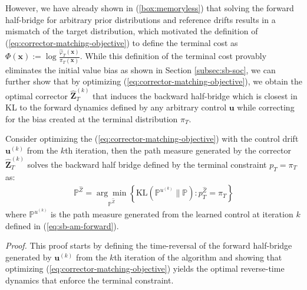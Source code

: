 \documentclass{article}
\begin{document}
However, we have already shown in (\ref{box:memoryless}) that solving the forward half-bridge for arbitrary prior distributions and reference drifts results in a mismatch of the target distribution, which motivated the definition of (\ref{eq:corrector-matching-objective}) to define the terminal cost as $\Phi(\boldsymbol{x}):= \log \frac{\hat\varphi_T(\boldsymbol{x})}{\pi_T(\boldsymbol{x})}$. While this definition of the terminal cost provably eliminates the initial value bias as shown in Section \ref{subsec:sb-soc}, we can further show that by optimizing (\ref{eq:corrector-matching-objective}), we obtain the optimal corrector $\widehat{\boldsymbol{Z}}_T^{(k)}$ that induces the backward half-bridge which is closest in KL to the forward dynamics defined by any arbitrary control $\boldsymbol{u}$ while correcting for the bias created at the terminal distribution $\pi_T$.

\begin{proposition}\label{prop:corrector-match}
    Consider optimizing the (\ref{eq:corrector-matching-objective}) with the control drift $\boldsymbol{u}^{(k)}$ from the $k$th iteration, then the path measure generated by the corrector $\widehat{\boldsymbol{Z}}_T^{(k)}$ solves the backward half bridge defined by the terminal constraint $p_T=\pi_T$ as:
    \begin{align}
        \mathbb{P}^{\widehat{Z}}=\underset{\mathbb{P}^{\widehat{Z}}}{\arg\min}\left\{\text{KL}(\mathbb{P}^{u^{(k)}}\|\mathbb{P}): p^{\widehat{Z}}_T=\pi_T\right\}
    \end{align}
    where $\mathbb{P}^{u^{(k)}}$ is the path measure generated from the learned control at iteration $k$ defined in (\ref{eq:sb-am-forward}).
\end{proposition}

\textit{Proof.} This proof starts by defining the time-reversal of the forward half-bridge generated by $\boldsymbol{u}^{(k)}$ from the $k$th iteration of the algorithm and showing that optimizing (\ref{eq:corrector-matching-objective}) yields the optimal reverse-time dynamics that enforce the terminal constraint.
\end{document}
